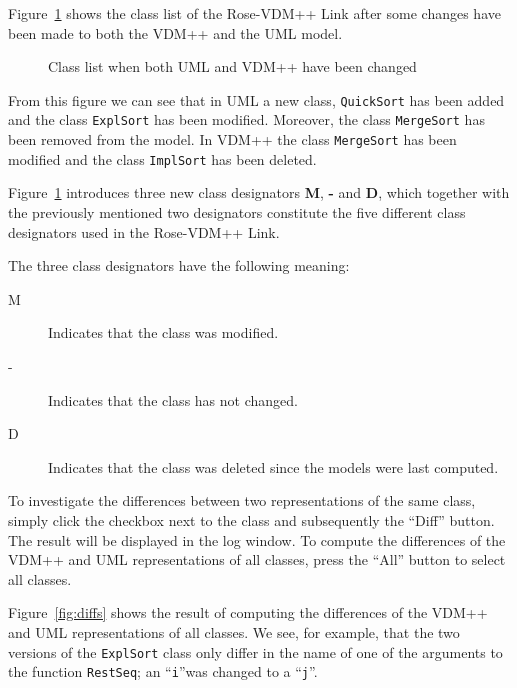 \documentclass[\pformat,12pt]{article}
\newcommand{\vdmpp}{VDM++}
\newcommand{\link}{Rose-\vdmpp{} Link}
\begin{document}
Figure~\ref{fig:mergeUMLVDM} shows the class list of the \link{} after
some changes have been made to both the \vdmpp{} and the UML model.
\begin{figure}[htb]
\begin{center}
\mbox{}
\caption{Class list when both UML and \vdmpp{} have been changed\label{fig:mergeUMLVDM}}
\end{center}
\end{figure}
From this figure we can see that in UML a new class, {\tt QuickSort}
has been added and the class {\tt ExplSort} has been modified. Moreover, the
class {\tt MergeSort} has been removed from the model. In \vdmpp{} the
class {\tt MergeSort} has been modified and the class {\tt ImplSort} has been
deleted. 

Figure~\ref{fig:mergeUMLVDM} introduces three new class
designators {\bf M}, {\bf -} and {\bf D}, which together with the
previously mentioned two designators constitute the five different
class designators used in the \link{}. 

The three class designators have the following meaning:
\begin{description}  
\item [M] Indicates that the class was modified.  
\item [-] Indicates that the class has not changed.  
\item [D] Indicates that the class was deleted since the models were last computed.  
\end{description}  
To investigate the differences between two representations of the same
class, simply click the checkbox next to the class and subsequently
the ``Diff'' button. The result will be displayed in the log window.
To compute the differences of the \vdmpp{} and UML representations of
all classes, press the ``All'' button to select all classes.

Figure~\ref{fig:diffs} shows the result of computing the differences of
the \vdmpp{} and UML representations of all classes. We see, for example, that the
two versions of the {\tt ExplSort} class only differ in the name of one of the arguments to the
function {\tt RestSeq}; an ``{\tt i}''was changed to a ``{\tt j}''.
\end{document}
